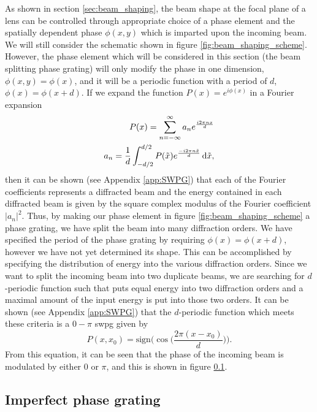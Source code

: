 As shown in section \ref{sec:beam_shaping}, the beam shape at the focal plane of a lens can be controlled through appropriate choice of a phase element and the spatially dependent phase $\phi(x,y)$ which is imparted upon the incoming beam.  We will still consider the schematic shown in figure \ref{fig:beam_shaping_scheme}.  However, the phase element which will be considered in this section (the beam splitting phase grating) will only modify the phase in one dimension, $\phi(x,y)=\phi(x)$, and it will be a periodic function with a period of $d$, $\phi(x)=\phi(x+d)$. If we expand the function $P(x)=e^{i\phi(x)}$ in a Fourier expansion
\begin{align}
	P(x) = \sum_{n=-\infty}^{\infty}a_n e^{\frac{i2\pi n x }{d}}\\
	a_n = \frac{1}{d}\int_{-d/2}^{d/2} P(\tilde{x})e^{\frac{-i2\pi n\tilde{x}}{d}}\mathop{}\!\mathrm{d}\tilde{x},
\end{align}
then it can be shown (see Appendix \ref{app:SWPG}) that each of the Fourier coefficients represents a diffracted beam and the energy contained in each diffracted beam is given by the square complex modulus of the Fourier coefficient $\rvert a_n\rvert^2$.  Thus, by making our phase element in figure \ref{fig:beam_shaping_scheme} a phase grating, we have split the beam into many diffraction orders.  We have specified the period of the phase grating by requiring $\phi(x)=\phi(x+d)$, however we have not yet determined its shape.  This can be accomplished by specifying the distribution of energy into the various diffraction orders.  Since we want to split the incoming beam into two duplicate beams, we are searching for $d$-periodic function such that puts equal energy into two diffraction orders and a maximal amount of the input energy is put into those two orders. It can be shown (see Appendix \ref{app:SWPG}) that the $d$-periodic function which meets these criteria is a $0-\pi$ \gls{swpg} given by
\begin{equation}
\label{eqn:swpg}
	P(x,x_0) = \mathrm{sign}\Bigg( \cos\bigg( \frac{2\pi(x-x_0)}{d}\bigg)\Bigg).
\end{equation} 
From this equation, it can be seen that the phase of the incoming beam is modulated by either $0$ or $\pi$, and this is shown in figure \ref{}.





\subsection{Imperfect phase grating}

